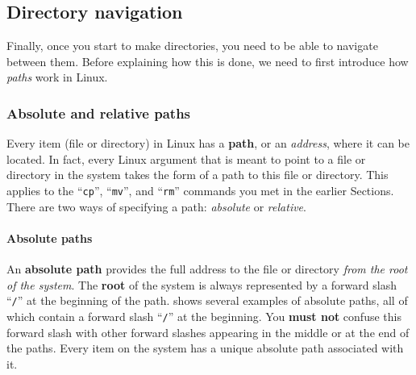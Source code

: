 

  \subsection{Directory navigation}

    Finally, once you start to make directories, you need to be able to navigate between them.
    Before explaining how this is done, we need to first introduce how \emph{paths} work in Linux.

    \subsubsection{Absolute and relative paths}

      Every item (file or directory) in Linux has a \textbf{path}, or an \emph{address}, where it can be located.
      In fact, every Linux argument that is meant to point to a file or directory in the system takes the form of a path to this file or directory.
      This applies to the \enquote{\texttt{cp}}, \enquote{\texttt{mv}}, and \enquote{\texttt{rm}} commands you met in the earlier Sections.
      There are two ways of specifying a path: \emph{absolute} or \emph{relative}.

      \paragraph{Absolute paths}
        An \textbf{absolute path} provides the full address to the file or directory \emph{from the root of the system}.
        The \textbf{root} of the system is always represented by a forward slash \enquote{\texttt{/}} at the beginning of the path.
         shows several examples of absolute paths, all of which contain a forward slash \enquote{\texttt{/}} at the beginning.
        You \textbf{must not} confuse this forward slash with other forward slashes appearing in the middle or at the end of the paths.
        Every item on the system has a unique absolute path associated with it.

